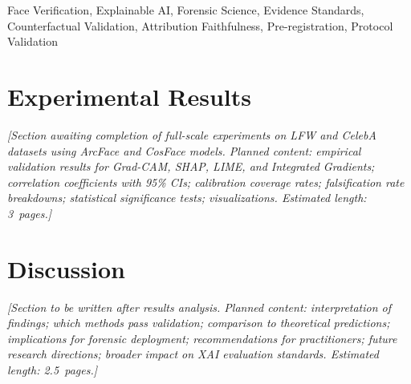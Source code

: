 \documentclass[journal]{IEEEtran}
\begin{document}
\begin{IEEEkeywords}
Face Verification, Explainable AI, Forensic Science, Evidence Standards, Counterfactual Validation, Attribution Faithfulness, Pre-registration, Protocol Validation
\end{IEEEkeywords}

\IEEEpeerreviewmaketitle








\section{Experimental Results}
\label{sec:results}
\textit{[Section awaiting completion of full-scale experiments on LFW and CelebA datasets using ArcFace and CosFace models. Planned content: empirical validation results for Grad-CAM, SHAP, LIME, and Integrated Gradients; correlation coefficients with 95\% CIs; calibration coverage rates; falsification rate breakdowns; statistical significance tests; visualizations. Estimated length: 3~pages.]}

\section{Discussion}
\label{sec:discussion}
\textit{[Section to be written after results analysis. Planned content: interpretation of findings; which methods pass validation; comparison to theoretical predictions; implications for forensic deployment; recommendations for practitioners; future research directions; broader impact on XAI evaluation standards. Estimated length: 2.5~pages.]}

\appendices




\end{document}
